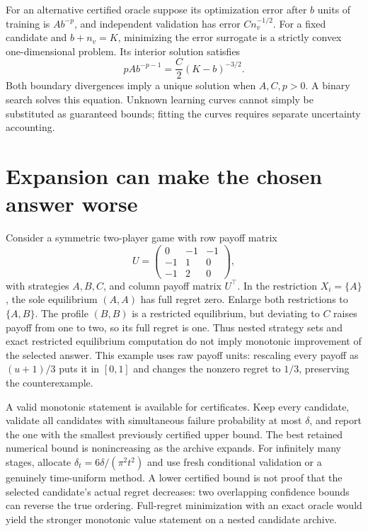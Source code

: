 \documentclass[11pt]{article}
\begin{document}
For an alternative certified oracle suppose its optimization error after $b$ units of training is $A b^{-p}$, and independent validation has error $C n_v^{-1/2}$. For a fixed candidate and $b+n_v=K$, minimizing the error surrogate is a strictly convex one-dimensional problem. Its interior solution satisfies
\[
 pA b^{-p-1}=\frac C2(K-b)^{-3/2}.
\]
Both boundary divergences imply a unique solution when $A,C,p>0$. A binary search solves this equation. Unknown learning curves cannot simply be substituted as guaranteed bounds; fitting the curves requires separate uncertainty accounting.

\section*{Expansion can make the chosen answer worse}
Consider a symmetric two-player game with row payoff matrix
\[
 U=\begin{pmatrix}0&-1&-1\\-1&1&0\\-1&2&0\end{pmatrix},
\]
with strategies $A,B,C$, and column payoff matrix $U^\top$. In the restriction $X_i=\{A\}$, the sole equilibrium $(A,A)$ has full regret zero. Enlarge both restrictions to $\{A,B\}$. The profile $(B,B)$ is a restricted equilibrium, but deviating to $C$ raises payoff from one to two, so its full regret is one. Thus nested strategy sets and exact restricted equilibrium computation do not imply monotonic improvement of the selected answer. This example uses raw payoff units: rescaling every payoff as $(u+1)/3$ puts it in $[0,1]$ and changes the nonzero regret to $1/3$, preserving the counterexample.

A valid monotonic statement is available for certificates. Keep every candidate, validate all candidates with simultaneous failure probability at most $\delta$, and report the one with the smallest previously certified upper bound. The best retained numerical bound is nonincreasing as the archive expands. For infinitely many stages, allocate $\delta_t=6\delta/(\pi^2t^2)$ and use fresh conditional validation or a genuinely time-uniform method. A lower certified bound is not proof that the selected candidate's actual regret decreases: two overlapping confidence bounds can reverse the true ordering. Full-regret minimization with an exact oracle would yield the stronger monotonic value statement on a nested candidate archive.
\end{document}
